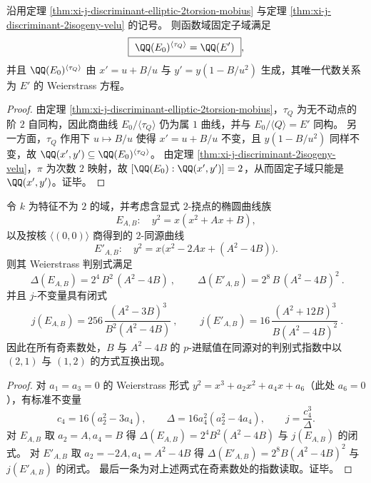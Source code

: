 \begin{corollary}[平移自同构的固定子域与无分歧商的生成元]\label{cor:xi-j-discriminant-translation-fixed-field-quotient}
沿用定理 \ref{thm:xi-j-discriminant-elliptic-2torsion-mobius} 与定理 \ref{thm:xi-j-discriminant-2isogeny-velu} 的记号。
则函数域固定子域满足
\[
\boxed{\ \QQ(E_0)^{\langle\tau_Q\rangle}=\QQ(E')\ },
\]
并且 \(\QQ(E_0)^{\langle\tau_Q\rangle}\) 由
\(
x'=u+B/u
\) 与
\(
y'=y(1-B/u^2)
\)
生成，其唯一代数关系为 \(E'\) 的 Weierstrass 方程。
\end{corollary}
\begin{proof}
由定理 \ref{thm:xi-j-discriminant-elliptic-2torsion-mobius}，\(\tau_Q\) 为无不动点的阶 \(2\) 自同构，因此商曲线 \(E_0/\langle\tau_Q\rangle\) 仍为属 \(1\) 曲线，并与 \(E_0/\langle Q\rangle=E'\) 同构。
另一方面，\(\tau_Q\) 作用下 \(u\mapsto B/u\) 使得 \(x'=u+B/u\) 不变，且
\(
y(1-B/u^2)
\)
同样不变，故 \(\QQ(x',y')\subseteq \QQ(E_0)^{\langle\tau_Q\rangle}\)。
由定理 \ref{thm:xi-j-discriminant-2isogeny-velu}，\(\pi\) 为次数 \(2\) 映射，故 \([\QQ(E_0):\QQ(x',y')]=2\)，从而固定子域只能是 \(\QQ(x',y')\)。证毕。
\end{proof}

\begin{theorem}\label{thm:xi-j-discriminant-2isogeny-discriminant-j-swap}
令 \(k\) 为特征不为 \(2\) 的域，并考虑含显式 \(2\)-挠点的椭圆曲线族
\[
E_{A,B}:\quad y^2=x(x^2+Ax+B),
\]
以及按核 \(\langle(0,0)\rangle\) 商得到的 \(2\)-同源曲线
\[
E'_{A,B}:\quad y^2=x\bigl(x^2-2Ax+(A^2-4B)\bigr).
\]
则其 Weierstrass 判别式满足
\[
\boxed{\ \Delta(E_{A,B})=2^4\,B^2\,(A^2-4B)\ },
\qquad
\boxed{\ \Delta(E'_{A,B})=2^8\,B\,(A^2-4B)^2\ }.
\]
并且 \(j\)-不变量具有闭式
\[
\boxed{\ j(E_{A,B})=256\,\frac{(A^2-3B)^3}{B^2(A^2-4B)}\ },
\qquad
\boxed{\ j(E'_{A,B})=16\,\frac{(A^2+12B)^3}{B(A^2-4B)^2}\ }.
\]
因此在所有奇素数处，\(B\) 与 \(A^2-4B\) 的 \(p\)-进赋值在同源对的判别式指数中以 \((2,1)\) 与 \((1,2)\) 的方式互换出现。
\end{theorem}
\begin{proof}
对 \(a_1=a_3=0\) 的 Weierstrass 形式 \(y^2=x^3+a_2x^2+a_4x+a_6\)（此处 \(a_6=0\)），有标准不变量
\[
c_4=16(a_2^2-3a_4),\qquad
\Delta=16a_4^2(a_2^2-4a_4),
\qquad
j=\frac{c_4^3}{\Delta}.
\]
对 \(E_{A,B}\) 取 \(a_2=A,a_4=B\) 得 \(\Delta(E_{A,B})=2^4B^2(A^2-4B)\) 与 \(j(E_{A,B})\) 的闭式。
对 \(E'_{A,B}\) 取 \(a_2=-2A,a_4=A^2-4B\) 得 \(\Delta(E'_{A,B})=2^8B(A^2-4B)^2\) 与 \(j(E'_{A,B})\) 的闭式。
最后一条为对上述两式在奇素数处的指数读取。证毕。
\end{proof}
